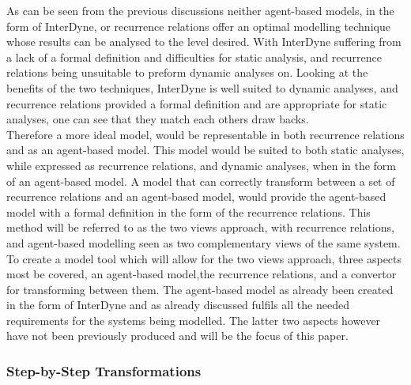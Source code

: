 \documentclass{article}
\begin{document}
As can be seen from the previous discussions neither agent-based models, in the form of InterDyne, or recurrence relations offer an optimal modelling technique whose results can be analysed to the level desired. With InterDyne suffering from a lack of a formal definition and difficulties for static analysis, and recurrence relations being unsuitable to preform dynamic analyses on. Looking at the benefits of the two techniques, InterDyne is well suited to dynamic analyses, and recurrence relations provided a formal definition and are appropriate for static analyses, one can see that they match each others draw backs.\\ 
Therefore a more ideal model, would be representable in both recurrence relations and as an agent-based model.  This model would be suited to both static analyses, while expressed as recurrence relations, and dynamic analyses, when in the form of an agent-based model. A model that can correctly transform between a set of recurrence relations and an agent-based model, would provide the agent-based model with a formal definition in the form of the recurrence relations. This method will be referred to as the two views approach, with recurrence relations, and agent-based modelling seen as two complementary views of the same system.\\
To create a model tool which will allow for the two views approach, three aspects most be covered, an agent-based model,the recurrence relations, and a convertor for transforming between them. The agent-based model as already been created in the form of InterDyne and as already discussed fulfils all the needed requirements for the systems being modelled. The latter two aspects however have not been previously produced and will be the focus of this paper.      

\subsubsection{Step-by-Step Transformations} \label{whyusestepbystep}

\end{document}
